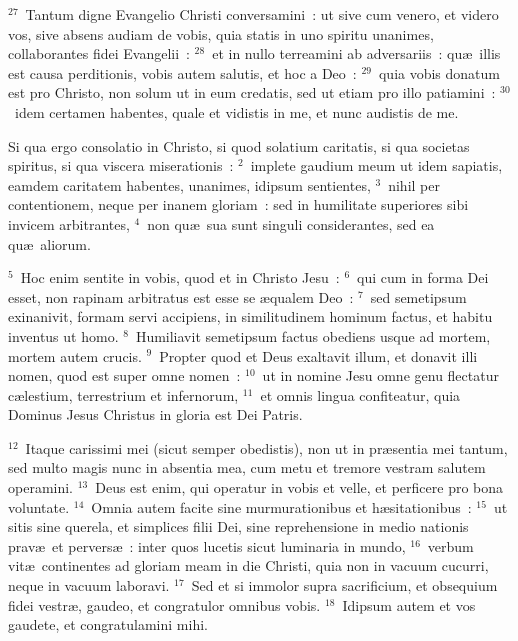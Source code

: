${}^{27}$~Tantum digne Evangelio Christi conversamini~: ut sive cum venero, et videro vos, sive absens audiam de vobis, quia statis in uno spiritu unanimes, collaborantes fidei Evangelii~:
${}^{28}$~et in nullo terreamini ab adversariis~: qu\ae\ illis est causa perditionis, vobis autem salutis, et hoc a Deo~:
${}^{29}$~quia vobis donatum est pro Christo, non solum ut in eum credatis, sed ut etiam pro illo patiamini~:
${}^{30}$~idem certamen habentes, quale et vidistis in me, et nunc audistis de me.

\lettrine[lines=3,image=true,loversize=0.05,lraise=-0.03]{S}{}i qua ergo consolatio in Christo, si quod solatium caritatis, si qua societas spiritus, si qua viscera miserationis~:
${}^{2}$~implete gaudium meum ut idem sapiatis, eamdem caritatem habentes, unanimes, idipsum sentientes,
${}^{3}$~nihil per contentionem, neque per inanem gloriam~: sed in humilitate superiores sibi invicem arbitrantes,
${}^{4}$~non qu\ae\ sua sunt singuli considerantes, sed ea qu\ae\ aliorum.


${}^{5}$~Hoc enim sentite in vobis, quod et in Christo Jesu~:
${}^{6}$~qui cum in forma Dei esset, non rapinam arbitratus est esse se \ae qualem Deo~:
${}^{7}$~sed semetipsum exinanivit, formam servi accipiens, in similitudinem hominum factus, et habitu inventus ut homo.
${}^{8}$~Humiliavit semetipsum factus obediens usque ad mortem, mortem autem crucis.
${}^{9}$~Propter quod et Deus exaltavit illum, et donavit illi nomen, quod est super omne nomen~:
${}^{10}$~ut in nomine Jesu omne genu flectatur c\ae lestium, terrestrium et infernorum,
${}^{11}$~et omnis lingua confiteatur, quia Dominus Jesus Christus in gloria est Dei Patris.


${}^{12}$~Itaque carissimi mei (sicut semper obedistis), non ut in pr\ae sentia mei tantum, sed multo magis nunc in absentia mea, cum metu et tremore vestram salutem operamini.
${}^{13}$~Deus est enim, qui operatur in vobis et velle, et perficere pro bona voluntate.
${}^{14}$~Omnia autem facite sine murmurationibus et h\ae sitationibus~:
${}^{15}$~ut sitis sine querela, et simplices filii Dei, sine reprehensione in medio nationis prav\ae\ et pervers\ae~: inter quos lucetis sicut luminaria in mundo,
${}^{16}$~verbum vit\ae\ continentes ad gloriam meam in die Christi, quia non in vacuum cucurri, neque in vacuum laboravi.
${}^{17}$~Sed et si immolor supra sacrificium, et obsequium fidei vestr\ae , gaudeo, et congratulor omnibus vobis.
${}^{18}$~Idipsum autem et vos gaudete, et congratulamini mihi.


